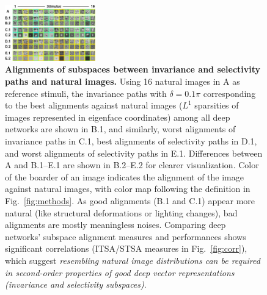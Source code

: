 \documentclass[10pt,twocolumn,letterpaper]{article}
\begin{document}
\begin{figure}
\begin{center}
\includegraphics[width=0.35\textwidth]{Figs/pic3.pdf} 
\end{center}
\caption{{\bf Alignments of subspaces between invariance and selectivity paths and natural images.}
Using 16 natural images in A as reference stimuli, the invariance paths with $\delta = 0.1\pi$ corresponding to the best alignments against natural images (\ie $L^1$ sparsities of images represented in eigenface coordinates) among all deep networks are shown in B.1, and similarly, worst alignments of invariance paths in C.1, best alignments of selectivity paths in D.1, and worst alignments of selectivity paths in E.1.
Differences between A and B.1--E.1 are shown in B.2--E.2 for clearer visualization.
Color of the boarder of an image indicates the alignment of the image against natural images, with color map following the definition in Fig.~\ref{fig:methods}.
As good alignments (B.1 and C.1) appear more natural (like structural deformations or lighting changes), bad alignments are mostly meaningless noises.
Comparing deep networks' subspace alignment measures and performances shows significant correlations (ITSA/STSA measures in Fig.~\ref{fig:corr}), which suggest \emph{resembling natural image distributions can be required in second-order properties of good deep vector representations (\ie invariance and selectivity subspaces)}.
} %
\label{fig:align}
\end{figure}
\end{document}

